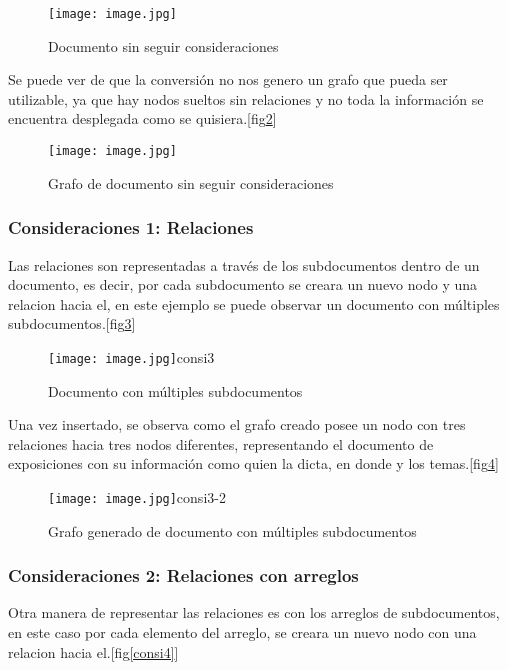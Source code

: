 \documentclass[conference,compsoc]{IEEEtran}
\begin{document}
\begin{figure}[!h]
\centering
\texttt{[image: image.jpg]}
\caption{Documento sin seguir consideraciones}
\label{consi2}
\end{figure}

Se puede ver de que la conversión no nos genero un grafo que pueda ser utilizable, ya que hay nodos sueltos sin relaciones y no toda la información se encuentra desplegada como se quisiera.[fig\ref{consi2-2}]

\begin{figure}[!h]
\centering
\texttt{[image: image.jpg]}
\caption{Grafo de documento sin seguir consideraciones}
\label{consi2-2}
\end{figure}

\subsubsection{Consideraciones 1: Relaciones}
Las relaciones son representadas a través de los subdocumentos dentro de un documento, es decir, por cada subdocumento se creara un nuevo nodo y una relacion hacia el, en este ejemplo se puede observar un documento con múltiples subdocumentos.[fig\ref{consi3}] 

\begin{figure}[!h]
\centering
\texttt{[image: image.jpg]}{consi3}
\caption{Documento con múltiples subdocumentos}
\label{consi3}
\end{figure}

Una vez insertado, se observa como el grafo creado posee un nodo con tres relaciones hacia tres nodos diferentes, representando el documento de exposiciones con su información como quien la dicta, en donde y los temas.[fig\ref{consi3-2}] 

\begin{figure}[!h]
\centering
\texttt{[image: image.jpg]}{consi3-2}
\caption{Grafo generado de documento con múltiples subdocumentos}
\label{consi3-2}
\end{figure}

\subsubsection{Consideraciones 2: Relaciones con arreglos}
Otra manera de representar las relaciones es con los arreglos de subdocumentos, en este caso por cada elemento del arreglo, se creara un nuevo nodo con una relacion hacia el.[fig\ref{consi4}] 
\end{document}

